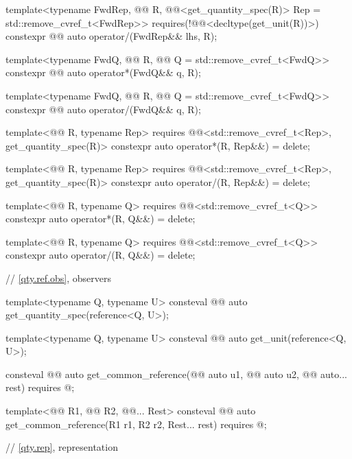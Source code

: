 \begin{codeblock}
{template<typename FwdRep, @@ R,
         @@<get_quantity_spec(R{})> Rep = std::remove_cvref_t<FwdRep>>
  requires(!@@<decltype(get_unit(R{}))>)
constexpr @@ auto operator/(FwdRep&& lhs, R);

template<typename FwdQ, @@ R, @@ Q = std::remove_cvref_t<FwdQ>>
constexpr @@ auto operator*(FwdQ&& q, R);

template<typename FwdQ, @@ R, @@ Q = std::remove_cvref_t<FwdQ>>
constexpr @@ auto operator/(FwdQ&& q, R);

template<@@ R, typename Rep>
  requires @@<std::remove_cvref_t<Rep>, get_quantity_spec(R{})>
constexpr auto operator*(R, Rep&&) = delete;

template<@@ R, typename Rep>
  requires @@<std::remove_cvref_t<Rep>, get_quantity_spec(R{})>
constexpr auto operator/(R, Rep&&) = delete;

template<@@ R, typename Q>
  requires @@<std::remove_cvref_t<Q>>
constexpr auto operator*(R, Q&&) = delete;

template<@@ R, typename Q>
  requires @@<std::remove_cvref_t<Q>>
constexpr auto operator/(R, Q&&) = delete;

// \ref{qty.ref.obs}, observers

template<typename Q, typename U>
consteval @@ auto get_quantity_spec(reference<Q, U>);

template<typename Q, typename U>
consteval @@ auto get_unit(reference<Q, U>);

consteval @@ auto get_common_reference(@@ auto u1,
                                                   @@ auto u2,
                                                   @@ auto... rest)
  requires @\seebelownc@;

template<@@ R1, @@ R2, @@... Rest>
consteval @@ auto get_common_reference(R1 r1, R2 r2, Rest... rest)
  requires @\seebelownc@;

// \ref{qty.rep}, representation

}
\end{codeblock}
